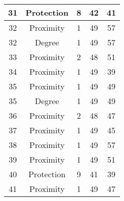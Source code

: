 \documentclass[results.tex]{subfiles}
\begin{document}
\begin{center}
\begin{tabular}{| c || c | c | c | c |}
            \hline
            31                      & Protection                   & 8                      & 42                      & 41                   \\
            \hline
            32                      & Proximity                    & 1                      & 49                      & 57                   \\
            \hline
            32                      & Degree                       & 1                      & 49                      & 57                   \\
            \hline
            33                      & Proximity                    & 2                      & 48                      & 51                   \\
            \hline
            34                      & Proximity                    & 1                      & 49                      & 39                   \\
            \hline
            35                      & Proximity                    & 1                      & 49                      & 49                   \\
            \hline
            35                      & Degree                       & 1                      & 49                      & 49                   \\
            \hline
            36                      & Proximity                    & 2                      & 48                      & 47                   \\
            \hline
            37                      & Proximity                    & 1                      & 49                      & 45                   \\
            \hline
            38                      & Proximity                    & 1                      & 49                      & 57                   \\
            \hline
            39                      & Proximity                    & 1                      & 49                      & 51                   \\
            \hline
            40                      & Protection                   & 9                      & 41                      & 39                   \\
            \hline
            41                      & Proximity                    & 1                      & 49                      & 47                   \\

\end{tabular}
\end{center}
\end{document}
